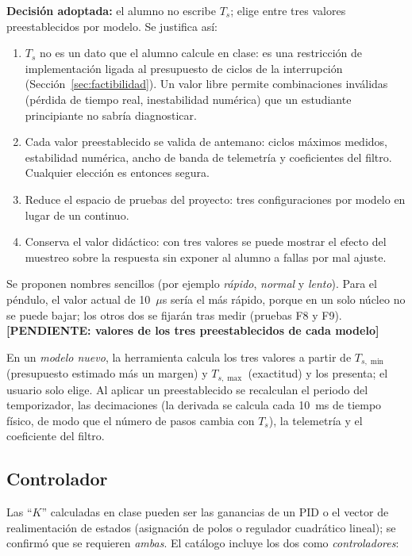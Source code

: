 \documentclass[12pt,letterpaper]{article}
\newcommand{\pendiente}[1]{\textbf{[PENDIENTE: #1]}}
\begin{document}
\textbf{Decisión adoptada:} el alumno no escribe $T_s$; elige entre tres valores preestablecidos por modelo. Se justifica así:
\begin{enumerate}
    \item $T_s$ no es un dato que el alumno calcule en clase: es una restricción de implementación ligada al presupuesto de ciclos de la interrupción (Sección~\ref{sec:factibilidad}). Un valor libre permite combinaciones inválidas (pérdida de tiempo real, inestabilidad numérica) que un estudiante principiante no sabría diagnosticar.
    \item Cada valor preestablecido se valida de antemano: ciclos máximos medidos, estabilidad numérica, ancho de banda de telemetría y coeficientes del filtro. Cualquier elección es entonces segura.
    \item Reduce el espacio de pruebas del proyecto: tres configuraciones por modelo en lugar de un continuo.
    \item Conserva el valor didáctico: con tres valores se puede mostrar el efecto del muestreo sobre la respuesta sin exponer al alumno a fallas por mal ajuste.
\end{enumerate}
Se proponen nombres sencillos (por ejemplo \emph{rápido}, \emph{normal} y \emph{lento}). Para el péndulo, el valor actual de 10~$\mu$s sería el más rápido, porque en un solo núcleo no se puede bajar; los otros dos se fijarán tras medir (pruebas F8 y F9). \pendiente{valores de los tres preestablecidos de cada modelo}

En un \emph{modelo nuevo}, la herramienta calcula los tres valores a partir de $T_{s,\min}$ (presupuesto estimado más un margen) y $T_{s,\max}$ (exactitud) y los presenta; el usuario solo elige. Al aplicar un preestablecido se recalculan el periodo del temporizador, las decimaciones (la derivada se calcula cada 10~ms de tiempo físico, de modo que el número de pasos cambia con $T_s$), la telemetría y el coeficiente del filtro.

\subsection{Controlador}
\label{sec:ctrl}

Las ``$K$'' calculadas en clase pueden ser las ganancias de un PID o el vector de realimentación de estados (asignación de polos o regulador cuadrático lineal); se confirmó que se requieren \emph{ambas}. El catálogo incluye los dos como \emph{controladores}:
\end{document}
